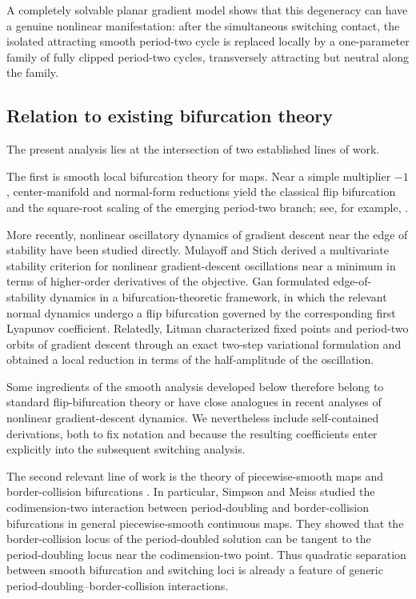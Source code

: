 A completely solvable planar gradient model shows that this
degeneracy can have a genuine nonlinear manifestation: after the
simultaneous switching contact, the isolated attracting smooth
period-two cycle is replaced locally by a one-parameter family of
fully clipped period-two cycles, transversely attracting but neutral
along the family.

\subsection{Relation to existing bifurcation theory}

The present analysis lies at the intersection of two established
lines of work.

The first is smooth local bifurcation theory for maps.
Near a simple multiplier $-1$, center-manifold and normal-form
reductions yield the classical flip bifurcation and the
square-root scaling of the emerging period-two branch; see,
for example,
\cite{Kuznetsov2004,GuckenheimerHolmes1983,ChowHale1982,
Wiggins2003,Arnold1983,Sotomayor1973,HaleKocak1991,PalisDeMelo1982}.

More recently, nonlinear oscillatory dynamics of gradient descent
near the edge of stability have been studied directly.
Mulayoff and Stich \cite{MulayoffStich2026} derived a multivariate
stability criterion for nonlinear gradient-descent oscillations
near a minimum in terms of higher-order derivatives of the
objective.
Gan \cite{Gan2026} formulated edge-of-stability dynamics in a
bifurcation-theoretic framework, in which the relevant normal
dynamics undergo a flip bifurcation governed by the corresponding
first Lyapunov coefficient.
Relatedly, Litman \cite{Litman2026} characterized fixed points and
period-two orbits of gradient descent through an exact two-step
variational formulation and obtained a local reduction in terms
of the half-amplitude of the oscillation.

Some ingredients of the smooth analysis developed below therefore
belong to standard flip-bifurcation theory or have close analogues
in recent analyses of nonlinear gradient-descent dynamics.
We nevertheless include self-contained derivations, both to fix
notation and because the resulting coefficients enter explicitly
into the subsequent switching analysis.

The second relevant line of work is the theory of piecewise-smooth
maps and border-collision bifurcations
\cite{NusseYorke1995,BanerjeeGrebogi1999,Feigin1970,diBernardo2008,
Simpson2010,Simpson2016}.
In particular, Simpson and Meiss
\cite{SimpsonMeiss2008,SimpsonMeiss2009,SimpsonMeiss2009Nonlinearity,
SimpsonMeiss2010,SimpsonMeiss2012} studied the codimension-two
interaction between period-doubling and border-collision
bifurcations in general piecewise-smooth continuous maps. They
showed that the border-collision locus of the period-doubled
solution can be tangent to the period-doubling locus near the
codimension-two point. Thus quadratic separation between smooth
bifurcation and switching loci is already a feature of generic
period-doubling--border-collision interactions.

